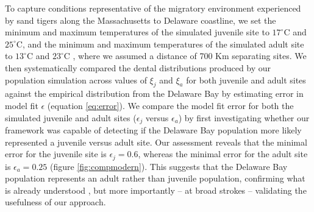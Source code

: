 \documentclass[]{rsos}%
\begin{document}
To capture conditions representative of the migratory environment experienced by sand tigers along the Massachusetts to Delaware coastline, we set the minimum and maximum temperatures of the simulated juvenile site to $17^\circ$C and $25^\circ$C, and the minimum and maximum temperatures of the simulated adult site to $13^\circ$C and $23^\circ$C \cite{Teter2015, haulsee2018spatial, Kneebone2012}, where we assumed a distance of 700 Km separating sites. 
We then systematically compared the dental distributions produced by our population simulation across values of $\xi_j$ and $\xi_a$ for both juvenile and adult sites against the empirical distribution from the Delaware Bay by estimating error in model fit $\epsilon$ (equation \ref{eq:error}).
We compare the model fit error for both the simulated juvenile and adult sites ($\epsilon_j$ versus $\epsilon_a$) by first investigating whether our framework was capable of detecting if the Delaware Bay population more likely represented a juvenile versus adult site.
Our assessment reveals that the minimal error for the juvenile site is $\epsilon_j = 0.6$, whereas the minimal error for the adult site is $\epsilon_a = 0.25$ (figure \ref{fig:compmodern}).
This suggests that the Delaware Bay population represents an adult rather than juvenile population, confirming what is already understood \cite{haulsee2018spatial, Kneebone2012}, but more importantly -- at broad strokes -- validating the usefulness of our approach.
\end{document}

